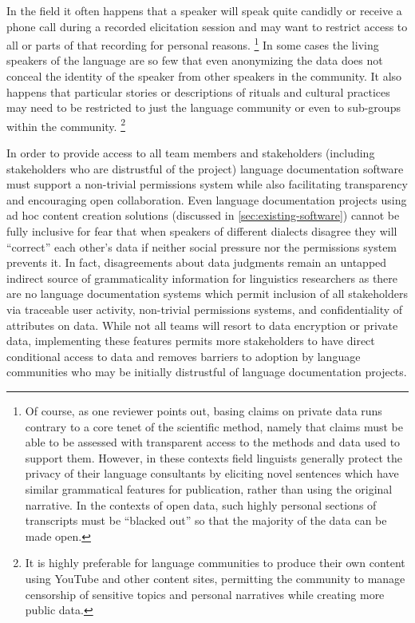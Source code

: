 \documentclass[11pt]{article}
\begin{document}
In the field it often happens that a speaker will speak quite candidly or
receive a phone call  during a recorded elicitation session and may want to
restrict access to all or parts of that recording for personal reasons.%
\footnote{Of course, as one reviewer points out, basing claims on private data
    runs contrary to a core tenet of the scientific method, namely that claims
    must be able to be assessed with transparent access to the methods and data
    used to support them.  However, in these contexts field linguists generally
    protect the privacy of their language consultants by eliciting novel
    sentences which have similar grammatical features for publication, rather
    than using the original narrative. In the contexts of open data, such
    highly personal sections of transcripts must be ``blacked out'' so that the
majority of the data can be made open.} %
In some cases the living speakers of the language are so few that even
anonymizing the data does not conceal the identity of the speaker from other
speakers in the community.  It also happens that particular stories or
descriptions of rituals and cultural practices may need to be restricted to just
the language community or even to sub-groups within the community.%
\footnote{It is highly preferable for language communities to produce
their own content using YouTube and other content sites, permitting the
community to manage censorship of sensitive topics and personal narratives
while creating more public data.}

In order to provide access to all team members and stakeholders (including
stakeholders who are distrustful of the project) language documentation
software must support a non-trivial permissions system while also facilitating
transparency and encouraging open collaboration. Even language documentation
projects using ad hoc content creation solutions (discussed in
\autoref{sec:existing-software}) cannot be fully inclusive for fear that when
speakers of different dialects disagree they will ``correct''  each other's
data if neither social pressure nor the permissions system prevents it.
In fact, disagreements about data judgments remain an untapped indirect source
of grammaticality information for linguistics researchers as there are no
language documentation systems which permit inclusion of all stakeholders via
traceable user activity, non-trivial permissions systems, and confidentiality
of attributes on data. While not all teams will resort to data encryption or
private data, implementing these features permits more stakeholders to have
direct conditional access to data and removes barriers to adoption by language
communities who may be initially distrustful of language documentation
projects.%
\end{document}

